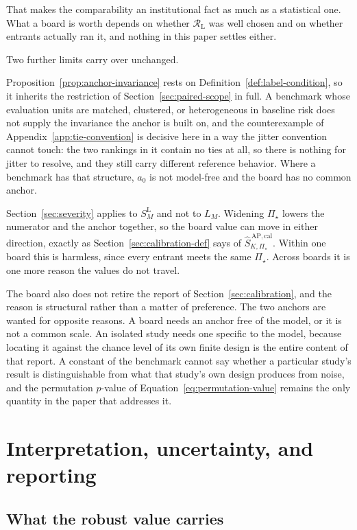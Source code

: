 \documentclass[11pt]{article}
\newcommand{\Regime}{\mathcal{R}}
\newcommand{\PSet}{\Pi_\star}
\newcommand{\SRobCalHat}{\widehat S_{K,\PSet}^{\,\mathrm{AP,cal}}}
\newcommand{\RegimeL}{\Regime_{\mathrm{L}}}
\newcommand{\SLead}{S^{\mathrm{L}}}
\theoremstyle{remark}
\begin{document}
That makes the comparability an institutional fact as much as a statistical one. What a board is worth depends on whether $\RegimeL$ was well chosen and on whether entrants actually ran it, and nothing in this paper settles either.

Two further limits carry over unchanged.

Proposition~\ref{prop:anchor-invariance} rests on Definition~\ref{def:label-condition}, so it inherits the restriction of Section~\ref{sec:paired-scope} in full. A benchmark whose evaluation units are matched, clustered, or heterogeneous in baseline risk does not supply the invariance the anchor is built on, and the counterexample of Appendix~\ref{app:tie-convention} is decisive here in a way the jitter convention cannot touch: the two rankings in it contain no ties at all, so there is nothing for jitter to resolve, and they still carry different reference behavior. Where a benchmark has that structure, $a_0$ is not model-free and the board has no common anchor.

Section~\ref{sec:severity} applies to $\SLead_M$ and not to $L_M$. Widening $\PSet$ lowers the numerator and the anchor together, so the board value can move in either direction, exactly as Section~\ref{sec:calibration-def} says of $\SRobCalHat$. Within one board this is harmless, since every entrant meets the same $\PSet$. Across boards it is one more reason the values do not travel.

The board also does not retire the report of Section~\ref{sec:calibration}, and the reason is structural rather than a matter of preference. The two anchors are wanted for opposite reasons. A board needs an anchor free of the model, or it is not a common scale. An isolated study needs one specific to the model, because locating it against the chance level of its own finite design is the entire content of that report. A constant of the benchmark cannot say whether a particular study's result is distinguishable from what that study's own design produces from noise, and the permutation $p$-value of Equation~\eqref{eq:permutation-value} remains the only quantity in the paper that addresses it.

\section{Interpretation, uncertainty, and reporting}
\label{sec:reporting}

\subsection{What the robust value carries}
\end{document}
